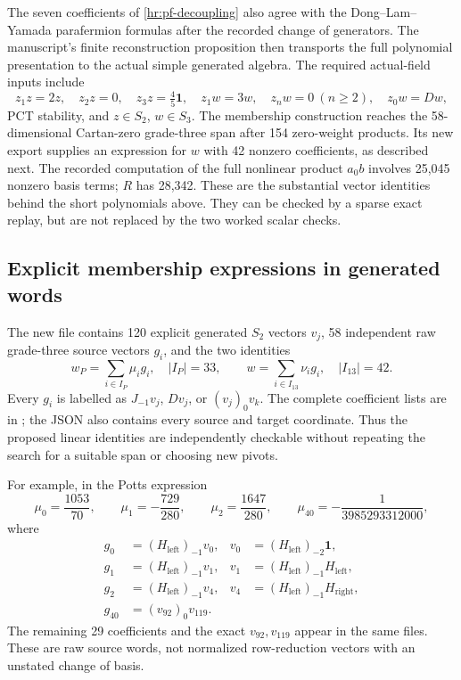 The seven coefficients of \eqref{hr:pf-decoupling} also agree with
the Dong--Lam--Yamada parafermion formulas after the recorded change
of generators. The manuscript's finite reconstruction proposition
then transports the full polynomial presentation to the actual
simple generated algebra. The required actual-field inputs include
\[
 z_1z=2z,\quad z_2z=0,\quad z_3z=\tfrac45\mathbf1,
 \quad z_1w=3w,\quad z_nw=0\ (n\geq2),\quad z_0w=Dw,
\]
PCT stability, and $z\in S_2$, $w\in S_3$. The membership
construction reaches the 58-dimensional Cartan-zero grade-three
span after 154 zero-weight products. Its new export supplies an
expression for $w$ with 42 nonzero coefficients, as described next.
The recorded computation of the full nonlinear product $a_0b$
involves 25,045 nonzero basis terms; $R$ has 28,342.
These are the substantial vector identities behind the short
polynomials above. They can be checked by a sparse exact replay,
but are not replaced by the two worked scalar checks.

\subsection{Explicit membership expressions in generated words}
\label{hr:membership-words}

The new file  contains 120
explicit generated $S_2$ vectors $v_j$, 58 independent raw
grade-three source vectors $g_i$, and the two identities
\[
 w_P=\sum_{i\in I_P}\mu_i g_i,\quad |I_P|=33,
 \qquad
 w=\sum_{i\in I_{13}}\nu_i g_i,\quad |I_{13}|=42.
\]
Every $g_i$ is labelled as $J_{-1}v_j$, $Dv_j$, or
$(v_j)_0v_k$. The complete coefficient lists are in
; the JSON also
contains every source and target coordinate. Thus the proposed
linear identities are independently checkable without repeating
the search for a suitable span or choosing new pivots.

For example, in the Potts expression
\[
 \mu_0=\frac{1053}{70},\qquad
 \mu_1=-\frac{729}{280},\qquad
 \mu_2=\frac{1647}{280},\qquad
 \mu_{40}=-\frac1{3985293312000},
\]
where
\begin{align*}
 g_0&=(H_\mathrm{left})_{-1}v_0,
 &v_0&=(H_\mathrm{left})_{-2}\mathbf1,\\
 g_1&=(H_\mathrm{left})_{-1}v_1,
 &v_1&=(H_\mathrm{left})_{-1}H_\mathrm{left},\\
 g_2&=(H_\mathrm{left})_{-1}v_4,
 &v_4&=(H_\mathrm{left})_{-1}H_\mathrm{right},\\
 g_{40}&=(v_{92})_0v_{119}.&&
\end{align*}
The remaining 29 coefficients and the exact $v_{92},v_{119}$
appear in the same files. These are raw source words, not normalized
row-reduction vectors with an unstated change of basis.

